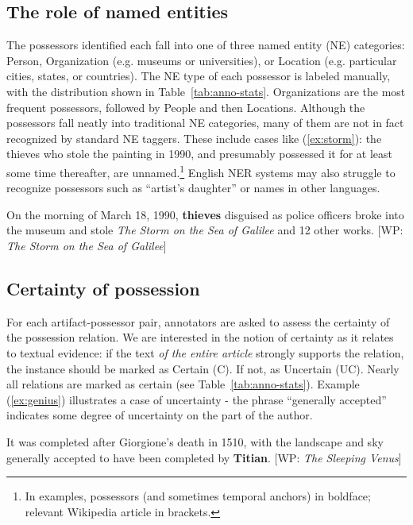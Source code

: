 \subsection{The role of named entities} \label{sec:nes}
The possessors identified each fall into one of three named entity (NE) categories: Person, Organization (e.g. museums or universities), or Location (e.g. particular cities, states, or countries). 
The NE type of each possessor is labeled manually, with the distribution shown in Table~\ref{tab:anno-stats}. 
Organizations are the most frequent possessors, followed by People and then Locations. 
Although the possessors fall neatly into traditional NE categories, many of them are not in fact recognized by standard NE taggers. 
These include cases like (\ref{ex:storm}): the thieves who stole the painting in 1990, and presumably possessed it for at least some time thereafter, are unnamed.\footnote{In examples, possessors (and sometimes temporal anchors) in boldface; relevant Wikipedia article in brackets.} English NER systems may also struggle to recognize possessors such as ``artist's daughter'' or names in other languages.





\begin{example}
On the morning of March 18, 1990, \textbf{thieves} disguised as police officers broke into the museum and stole \textit{The Storm on the Sea of Galilee} and 12 other works. {\small [WP: \textit{The Storm on the Sea of Galilee}]} \label{ex:storm}
\end{example}

\subsection{Certainty of possession} \label{sec:cert}
For each artifact-possessor pair, annotators are asked to assess the certainty of the possession relation. 
We are interested in the notion of certainty as it relates to textual evidence: if the text \textit{of the entire article} strongly supports the relation, the instance should be marked as Certain (C). 
If not, as Uncertain (UC). 
Nearly all relations are marked as certain (see Table~\ref{tab:anno-stats}).
Example (\ref{ex:genius}) illustrates a case of uncertainty - the phrase ``generally accepted'' indicates some degree of uncertainty on the part of the author.

\begin{example}
It was completed after Giorgione's death in 1510, with the landscape and sky generally accepted to have been completed by \textbf{Titian}. {\small[WP: \textit{The Sleeping Venus}]} \label{ex:genius}
\end{example}

